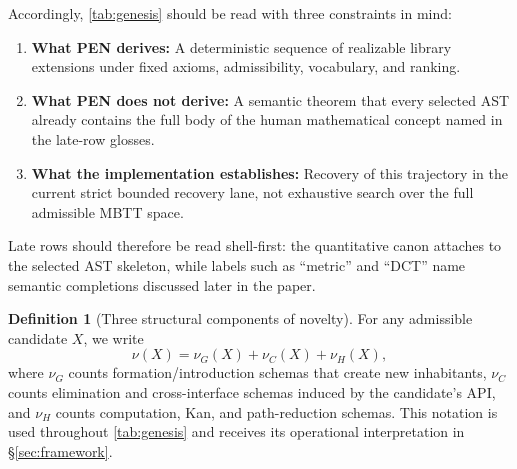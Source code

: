 \documentclass[11pt,a4paper]{article}
\theoremstyle{plain}
\theoremstyle{definition}
\newtheorem{definition}[theorem]{Definition}
\theoremstyle{remark}
\begin{document}
Accordingly, \cref{tab:genesis} should be read with three constraints in mind:
\begin{enumerate}[nosep]
    \item \textbf{What PEN derives:} A deterministic sequence of realizable library extensions under fixed axioms, admissibility, vocabulary, and ranking.
    \item \textbf{What PEN does not derive:} A semantic theorem that every selected AST already contains the full body of the human mathematical concept named in the late-row glosses.
    \item \textbf{What the implementation establishes:} Recovery of this trajectory in the current strict bounded recovery lane, not exhaustive search over the full admissible MBTT space.
\end{enumerate}
Late rows should therefore be read shell-first: the quantitative canon attaches to the selected AST skeleton, while labels such as ``metric'' and ``DCT'' name semantic completions discussed later in the paper.

\begin{definition}[Three structural components of novelty]
\label{def:nu-components-preview}
For any admissible candidate $X$, we write
\[
  \nu(X) = \nu_G(X) + \nu_C(X) + \nu_H(X),
\]
where $\nu_G$ counts formation/introduction schemas that create new inhabitants, $\nu_C$ counts elimination and cross-interface schemas induced by the candidate's API, and $\nu_H$ counts computation, Kan, and path-reduction schemas.
This notation is used throughout \cref{tab:genesis} and receives its operational interpretation in \S\ref{sec:framework}.
\end{definition}
\end{document}
